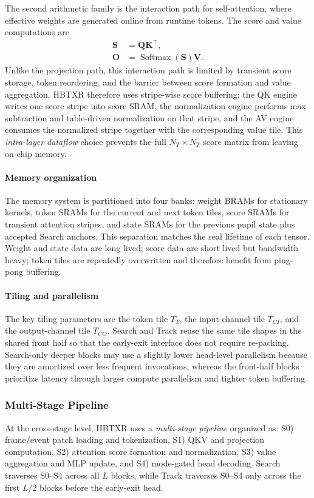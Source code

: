 \documentclass[journal]{IEEEtran}
\begin{document}
The second arithmetic family is the interaction path for self-attention, where effective weights are generated online from runtime tokens. The score and value computations are
\begin{align}
\mathbf S &= \mathbf Q\mathbf K^\top,\\
\mathbf O &= \operatorname{Softmax}(\mathbf S)\mathbf V.
\end{align}
Unlike the projection path, this interaction path is limited by transient score storage, token reordering, and the barrier between score formation and value aggregation. HBTXR therefore uses stripe-wise score buffering: the QK engine writes one score stripe into score SRAM, the normalization engine performs max subtraction and table-driven normalization on that stripe, and the AV engine consumes the normalized stripe together with the corresponding value tile. This \emph{intra-layer dataflow} choice prevents the full $N_T\times N_T$ score matrix from leaving on-chip memory.

\paragraph*{Memory organization}
The memory system is partitioned into four banks: weight BRAMs for stationary kernels, token SRAMs for the current and next token tiles, score SRAMs for transient attention stripes, and state SRAMs for the previous pupil state plus accepted Search anchors. This separation matches the real lifetime of each tensor. Weight and state data are long lived; score data are short lived but bandwidth heavy; token tiles are repeatedly overwritten and therefore benefit from ping-pong buffering.

\paragraph*{Tiling and parallelism}
The key tiling parameters are the token tile $T_T$, the input-channel tile $T_{CI}$, and the output-channel tile $T_{CO}$. Search and Track reuse the same tile shapes in the shared front half so that the early-exit interface does not require re-packing. Search-only deeper blocks may use a slightly lower head-level parallelism because they are amortized over less frequent invocations, whereas the front-half blocks prioritize latency through larger compute parallelism and tighter token buffering.

\subsubsection{Multi-Stage Pipeline}
At the cross-stage level, HBTXR uses a \emph{multi-stage pipeline} organized as: S0) frame/event patch loading and tokenization, S1) QKV and projection computation, S2) attention score formation and normalization, S3) value aggregation and MLP update, and S4) mode-gated head decoding. Search traverses S0--S4 across all $L$ blocks, while Track traverses S0--S4 only across the first $L/2$ blocks before the early-exit head.
\end{document}
